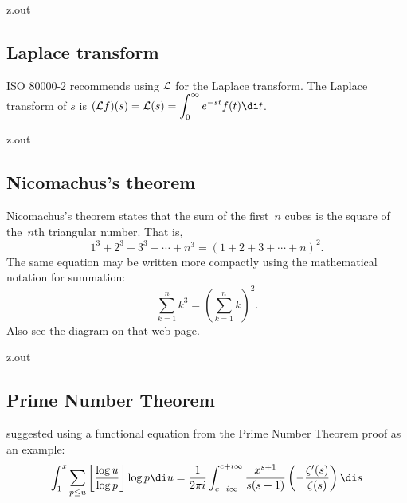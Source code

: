 \begin{VerbatimOut}{z.out}

\subsection{Laplace transform}

ISO 80000-2
\cite[page 25]{iso80000-2}
recommends using
\(\mathcal{L}\)
for the Laplace transform.
The Laplace transform of \(s\) is
\(
  \displaystyle
  (\Laplace f)(s)
  = \Laplace(s)
  = \int_0^\infty e^{-st} f(t) \di t
\).
\end{VerbatimOut}

\MyIO


\begin{VerbatimOut}{z.out}

\subsection{Nicomachus's theorem}
Nicomachus's theorem
\cite{wikipedia-nicomachus}
states that
the sum of the first~\(n\) cubes is the square of the~\(n\)th triangular number.
That is,
\begin{equation}
  1^3 + 2^3 + 3^3 + \cdots + n^3 = (1 + 2 + 3 + \cdots + n)^2.
\end{equation}
The same equation may be written more compactly using the mathematical notation for summation:
\begin{equation*}
  \sum_{k=1}^n k^3 = \left(\sum_{k=1}^n k\right)^2.
\end{equation*}
Also see the diagram on that web page.
\end{VerbatimOut}

\MyIO


\begin{VerbatimOut}{z.out}

\subsection{Prime Number Theorem}

\textcite{li2013}
suggested using a functional equation
from the Prime Number Theorem proof
as an example:
\begin{equation}
  \int_1^x
    \sum_{p\le u}
    \left\lfloor\frac{\log u}{\log p}\right\rfloor
    \log p
    \di u
    =
    \frac1{2\pi i}
    \int_{c-i\infty}^{c+i\infty}
    \frac{x^{s+1}}{s(s+1)}
    \left(-\frac{\zeta'(s)}{\zeta(s)}\right)
    \di s
\end{equation}
\end{VerbatimOut}

